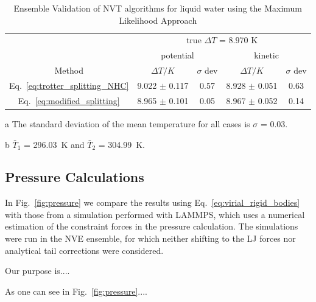 \documentclass[aip,jcp,reprint,amsmath,amssymb]{revtex4-1}
\begin{document}
\begin{table}
	\begin{threeparttable}
		\caption{Ensemble Validation of NVT algorithms for liquid water using the Maximum Likelihood Approach  }
		\label{table:ensemblevalidation}
		\begin{ruledtabular}
			\begin{tabular}{ccccc}
				& \multicolumn{4}{c}{true $\Delta T$ = 8.970 K} \\
				\cline{2-5}
				& \multicolumn{2}{c}{potential} & \multicolumn{2}{c}{kinetic}\\
				\hline
				Method  &$\Delta T/K$ & $\sigma$ dev & $\Delta T/K$ & $\sigma$ dev \\
				\hline %
				Eq.~\ref{eq:trotter_splitting_NHC} & 9.022 $\pm$ 0.117 & 0.57 & 8.928 $\pm$ 0.051 & 0.63 \\
				Eq.~\ref{eq:modified_splitting}    & 8.965 $\pm$ 0.101 & 0.05 & 8.967 $\pm$ 0.052 & 0.14
		\end{tabular}
		\end{ruledtabular}
		\begin{tablenotes}
			\item[a] The standard deviation of the mean temperature for all cases is $\sigma$ = 0.03.
			\item[b] $\bar{T}_1$ = 296.03~K and $\bar{T}_2$ = 304.99~K.
		\end{tablenotes}
	\end{threeparttable}
\end{table}

\subsection{Pressure Calculations}

In Fig.~\ref{fig:pressure} we compare the results using Eq.~\ref{eq:virial_rigid_bodies} with those from a simulation performed with LAMMPS, which uses a numerical estimation of the constraint forces in the pressure calculation. The simulations were run in the NVE ensemble, for which neither shifting to the LJ forces nor analytical tail corrections were considered.

Our purpose is....

As one can see in Fig.~\ref{fig:pressure}....

\end{document}
